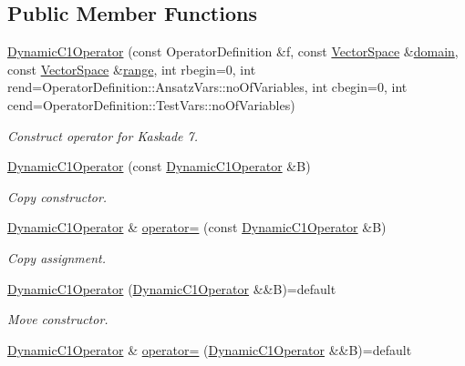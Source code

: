 \subsection*{Public Member Functions}
\begin{DoxyCompactItemize}
\item 
\hyperlink{classSpacy_1_1Kaskade_1_1DynamicC1Operator_a5b9e778e72f9e8039efcfca2a5776528}{Dynamic\+C1\+Operator} (const Operator\+Definition \&f, const \hyperlink{classSpacy_1_1VectorSpace}{Vector\+Space} \&\hyperlink{classSpacy_1_1OperatorBase_a2588f9b3e0188820c4c494e63293dc6f}{domain}, const \hyperlink{classSpacy_1_1VectorSpace}{Vector\+Space} \&\hyperlink{classSpacy_1_1OperatorBase_ab19d3b7a6f290b1079248f1e567e53d6}{range}, int rbegin=0, int rend=Operator\+Definition\+::\+Ansatz\+Vars\+::no\+Of\+Variables, int cbegin=0, int cend=Operator\+Definition\+::\+Test\+Vars\+::no\+Of\+Variables)
\begin{DoxyCompactList}\small\item\em Construct operator for Kaskade 7. \end{DoxyCompactList}\item 
\hyperlink{classSpacy_1_1Kaskade_1_1DynamicC1Operator_ac0d968516e017aa8e46f33273ee715b4}{Dynamic\+C1\+Operator} (const \hyperlink{classSpacy_1_1Kaskade_1_1DynamicC1Operator}{Dynamic\+C1\+Operator} \&B)
\begin{DoxyCompactList}\small\item\em Copy constructor. \end{DoxyCompactList}\item 
\hyperlink{classSpacy_1_1Kaskade_1_1DynamicC1Operator}{Dynamic\+C1\+Operator} \& \hyperlink{classSpacy_1_1Kaskade_1_1DynamicC1Operator_aa096a4b6941e19a9855eb1b2fa8ab156}{operator=} (const \hyperlink{classSpacy_1_1Kaskade_1_1DynamicC1Operator}{Dynamic\+C1\+Operator} \&B)
\begin{DoxyCompactList}\small\item\em Copy assignment. \end{DoxyCompactList}\item 
\hyperlink{classSpacy_1_1Kaskade_1_1DynamicC1Operator_a7e946ceb59cd4c4ab283a0ac55312eee}{Dynamic\+C1\+Operator} (\hyperlink{classSpacy_1_1Kaskade_1_1DynamicC1Operator}{Dynamic\+C1\+Operator} \&\&B)=default
\begin{DoxyCompactList}\small\item\em Move constructor. \end{DoxyCompactList}\item 
\hyperlink{classSpacy_1_1Kaskade_1_1DynamicC1Operator}{Dynamic\+C1\+Operator} \& \hyperlink{classSpacy_1_1Kaskade_1_1DynamicC1Operator_ad7259427c3acfdccd8dc8e5c644ed8ea}{operator=} (\hyperlink{classSpacy_1_1Kaskade_1_1DynamicC1Operator}{Dynamic\+C1\+Operator} \&\&B)=default

\end{DoxyCompactItemize}
